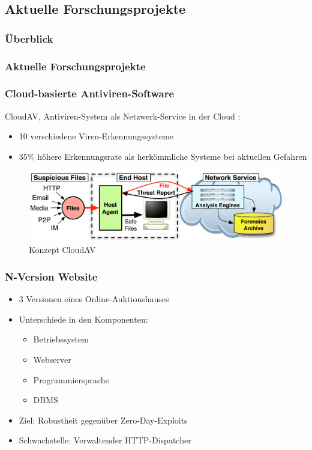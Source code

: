 \subsection{Aktuelle Forschungsprojekte}
%
%
\begin{frame}
	\frametitle{Überblick}
	\tableofcontents[currentsubsection]
\end{frame}
%
\begin{frame}
	\frametitle{Aktuelle Forschungsprojekte}
	
	
\end{frame}
%
%
\begin{frame}
	\frametitle{Cloud-basierte Antiviren-Software}
	
	CloudAV, Antiviren-System als Netzwerk-Service in der Cloud \cite{Oberheide:2008:CNA:1496711.1496718}: 
	\begin{itemize}
		\item 10 verschiedene Viren-Erkennungssysteme
		\item $35\%$ höhere Erkennungsrate als herkömmliche Systeme bei aktuellen Gefahren
	\end{itemize}
	\pause
	\begin{figure}
		\includegraphics[scale=0.2]{grafiken/antivir.png}		
		\caption{Konzept CloudAV
			\footnotemark		
		}		
	\end{figure}
\end{frame}
%
%
\begin{frame}
	\frametitle{N-Version Website}

	\begin{itemize}
		\item 3 Versionen eines Online-Auktionshauses \cite{zero-day}
		\item Unterschiede in den Komponenten:
		\begin{itemize}
			\item Betriebssystem
			\item Webserver
			\item Programmiersprache
			\item DBMS
		\end{itemize}
		\item Ziel: Robustheit gegenüber Zero-Day-Exploits
		\item Schwachstelle: Verwaltender HTTP-Dispatcher

	\end{itemize}
	
\end{frame}
%